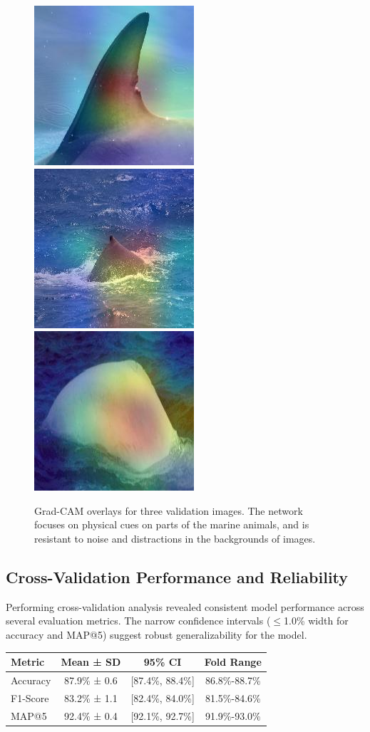 \documentclass[twocolumn]{article}
\begin{document}
\begin{figure}[H]
  \includegraphics[width=0.32\linewidth]{gradcam_dusky_dolphin.jpg}
  \includegraphics[width=0.32\linewidth]{gradcam_humpback_whale.jpg}
  \includegraphics[width=0.32\linewidth]{gradcam_beluga.jpg}
  \caption{Grad-CAM overlays for three validation
  images.  The network focuses on physical cues on parts of the marine animals, and is resistant to noise and distractions in the backgrounds of images.}
  \label{fig:gradcam_examples}
\end{figure}

\subsection{Cross-Validation Performance and Reliability}

Performing cross-validation analysis revealed consistent model performance across several evaluation metrics. The narrow confidence intervals (\(\leq\)1.0\% width for accuracy and MAP@5) suggest robust generalizability for the model.

\begin{table}
\begin{tabular}{l c c c}
\hline
\textbf{Metric} & \textbf{Mean ± SD} & \textbf{95\% CI} & \textbf{Fold Range} \\ \hline
Accuracy & 87.9\% ± 0.6 & [87.4\%, 88.4\%] & 86.8\%-88.7\% \\
F1-Score & 83.2\% ± 1.1 & [82.4\%, 84.0\%] & 81.5\%-84.6\% \\
MAP@5 & 92.4\% ± 0.4 & [92.1\%, 92.7\%] & 91.9\%-93.0\% \\ \hline
\end{tabular}
\end{table}
\end{document}

